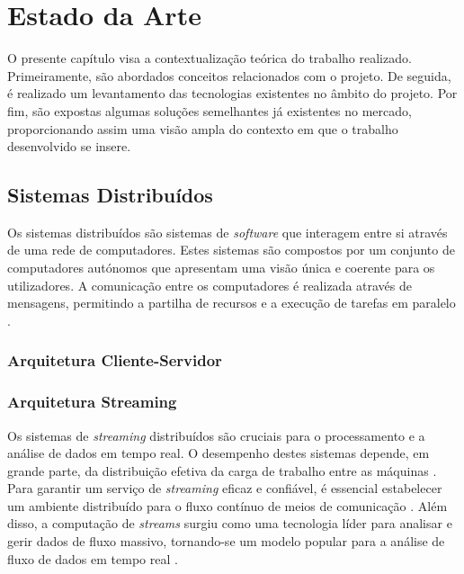 \chapter{Estado da Arte}
\label{sec:2-EstadoArte}

O presente capítulo visa a contextualização teórica do trabalho realizado. Primeiramente, são 
abordados conceitos relacionados com o projeto. De seguida, é realizado um levantamento das 
tecnologias existentes no âmbito do projeto. Por fim, são expostas algumas soluções semelhantes 
já existentes no mercado, proporcionando assim uma visão ampla do contexto em que o trabalho 
desenvolvido se insere.

\section{Sistemas Distribuídos}

Os sistemas distribuídos são sistemas de \textit{software} que interagem entre si através de uma rede
de computadores. Estes sistemas são compostos por um conjunto de computadores autónomos que
apresentam uma visão única e coerente para os utilizadores. A comunicação entre os computadores
é realizada através de mensagens, permitindo a partilha de recursos e a execução de tarefas em
paralelo \cite{verissimo2001distributed}.


\subsection{Arquitetura Cliente-Servidor}


\subsection{Arquitetura Streaming}

Os sistemas de \textit{streaming} distribuídos são cruciais para o processamento e a análise de dados 
em tempo real. O desempenho destes sistemas depende, em grande parte, da distribuição efetiva da 
carga de trabalho entre as máquinas \cite{stream2020}. Para garantir um serviço de \textit{streaming} 
eficaz e confiável, é essencial estabelecer um ambiente distribuído para o fluxo contínuo de 
meios de comunicação \cite{stream2014}. Além disso, a computação de \textit{streams} surgiu como 
uma tecnologia líder para analisar e gerir dados de fluxo massivo, tornando-se um modelo popular
para a análise de fluxo de dados em tempo real \cite{stream2018} \cite{stream2018b}.

